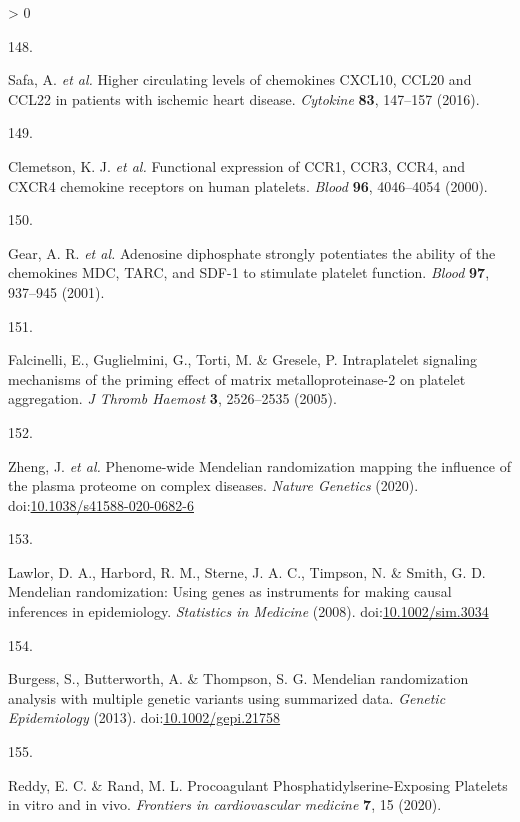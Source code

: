\documentclass[11pt,twoside]{bristolthesis}
\newlength{\cslhangindent}
\newlength{\csllabelwidth}
\newenvironment{CSLReferences}[2] %
 {%
  \setlength{\parindent}{0pt}
  \ifodd #1 \everypar{\setlength{\hangindent}{\cslhangindent}}\ignorespaces\fi
  \ifnum #2 > 0
  \setlength{\parskip}{#2\baselineskip}
  \fi
 }%
 {}
\newcommand{\CSLLeftMargin}[1]{\parbox[t]{\csllabelwidth}{#1}}
\newcommand{\CSLRightInline}[1]{\parbox[t]{\linewidth - \csllabelwidth}{#1}\break}
\begin{document}
\begin{CSLReferences}{0}{0}
\leavevmode\hypertarget{ref-Safa2016}{}%
\CSLLeftMargin{148. }
\CSLRightInline{Safa, A. \emph{et al.} {Higher circulating levels of chemokines CXCL10, CCL20 and CCL22 in patients with ischemic heart disease}. \emph{Cytokine} \textbf{83}, 147--157 (2016).}

\leavevmode\hypertarget{ref-Clemetson2000}{}%
\CSLLeftMargin{149. }
\CSLRightInline{Clemetson, K. J. \emph{et al.} {Functional expression of CCR1, CCR3, CCR4, and CXCR4 chemokine receptors on human platelets}. \emph{Blood} \textbf{96}, 4046--4054 (2000).}

\leavevmode\hypertarget{ref-Gear2001}{}%
\CSLLeftMargin{150. }
\CSLRightInline{Gear, A. R. \emph{et al.} {Adenosine diphosphate strongly potentiates the ability of the chemokines MDC, TARC, and SDF-1 to stimulate platelet function}. \emph{Blood} \textbf{97}, 937--945 (2001).}

\leavevmode\hypertarget{ref-Falcinelli2005}{}%
\CSLLeftMargin{151. }
\CSLRightInline{Falcinelli, E., Guglielmini, G., Torti, M. \& Gresele, P. {Intraplatelet signaling mechanisms of the priming effect of matrix metalloproteinase-2 on platelet aggregation}. \emph{J Thromb Haemost} \textbf{3}, 2526--2535 (2005).}

\leavevmode\hypertarget{ref-Zheng2020}{}%
\CSLLeftMargin{152. }
\CSLRightInline{Zheng, J. \emph{et al.} {Phenome-wide Mendelian randomization mapping the influence of the plasma proteome on complex diseases}. \emph{Nature Genetics} (2020). doi:\href{https://doi.org/10.1038/s41588-020-0682-6}{10.1038/s41588-020-0682-6}}

\leavevmode\hypertarget{ref-Lawlor2008}{}%
\CSLLeftMargin{153. }
\CSLRightInline{Lawlor, D. A., Harbord, R. M., Sterne, J. A. C., Timpson, N. \& Smith, G. D. {Mendelian randomization: Using genes as instruments for making causal inferences in epidemiology}. \emph{Statistics in Medicine} (2008). doi:\href{https://doi.org/10.1002/sim.3034}{10.1002/sim.3034}}

\leavevmode\hypertarget{ref-Burgess2013}{}%
\CSLLeftMargin{154. }
\CSLRightInline{Burgess, S., Butterworth, A. \& Thompson, S. G. {Mendelian randomization analysis with multiple genetic variants using summarized data}. \emph{Genetic Epidemiology} (2013). doi:\href{https://doi.org/10.1002/gepi.21758}{10.1002/gepi.21758}}

\leavevmode\hypertarget{ref-Reddy2020}{}%
\CSLLeftMargin{155. }
\CSLRightInline{Reddy, E. C. \& Rand, M. L. {Procoagulant Phosphatidylserine-Exposing Platelets in vitro and in vivo}. \emph{Frontiers in cardiovascular medicine} \textbf{7}, 15 (2020).}


\end{CSLReferences}
\end{document}
